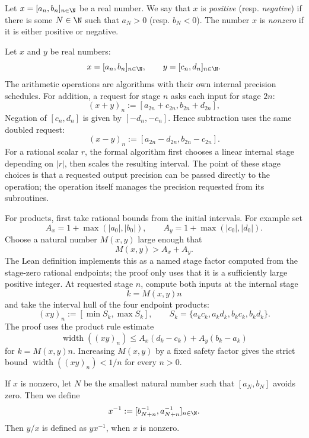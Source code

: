 \begin{definition}\label{def:raw-real-sign}
Let \(x=[a_n,b_n]_{n\in\N}\) be a real number.  We say that \(x\) is
\emph{positive} (resp. \emph{negative}) if there is some \(N\in\N\) such that
\( a_N > 0\) (resp. \( b_N<0 \)).
The number \(x\) is \emph{nonzero} if it is either positive or negative.
\end{definition}

\begin{definition}\label{def:raw-real-arithmetic}
Let \(x\) and \(y\) be real numbers:
\[
  x=[a_n,b_n]_{n\in\N},\qquad y=[c_n,d_n]_{n\in\N}.
\]
The arithmetic operations are algorithms with their own internal precision
schedules.  For addition, a request for stage \(n\) asks each input for stage
\(2n\):
\[
  (x+y)_n := [a_{2n}+c_{2n},b_{2n}+d_{2n}],
\]
Negation of \([c_n,d_n]\) is given by \([-d_n,-c_n]\).  Hence subtraction uses
the same doubled request:
\[
  (x-y)_n := [a_{2n}-d_{2n},b_{2n}-c_{2n}].
\]
For a rational scalar \(r\), the formal algorithm first chooses a linear
internal stage depending on \(|r|\), then scales the resulting interval.  The
point of these stage choices is that a requested output precision can be
passed directly to the operation; the operation itself manages the precision
requested from its subroutines.

For products, first take rational bounds from the initial intervals.  For
example set
\[
  A_x=1+\max(|a_0|,|b_0|),\qquad
  A_y=1+\max(|c_0|,|d_0|).
\]
Choose a natural number \(M(x,y)\) large enough that
\[
  M(x,y) > A_x+A_y.
\]
The Lean definition implements this as a named stage factor computed from the
stage-zero rational endpoints; the proof only uses that it is a sufficiently
large positive integer.
At requested stage \(n\), compute both inputs at the internal stage
\[
  k=M(x,y)n
\]
and take the interval hull of the four endpoint products:
\[
  (xy)_n :=
  \left[
    \min S_k,\max S_k
  \right],
  \qquad
  S_k=\{a_kc_k,a_kd_k,b_kc_k,b_kd_k\}.
\]
The proof uses the product rule estimate
\[
  \operatorname{width}((xy)_n)
  \le A_x(d_k-c_k)+A_y(b_k-a_k)
\]
for \(k=M(x,y)n\).  Increasing \(M(x,y)\) by a fixed safety factor gives the strict bound
\(\operatorname{width}((xy)_n)<1/n\) for every \(n>0\).

If \(x\) is nonzero, let \(N\) be the smallest natural number such that
\([a_N,b_N]\) avoids zero.  Then
we define
\[
  x^{-1}:= [ b_{N+n}^{-1}, a_{N+n}^{-1} ]_{n\in\N}.
\]
Then \(y/x\) is defined as \(yx^{-1}\), when \(x\) is nonzero.
\end{definition}

